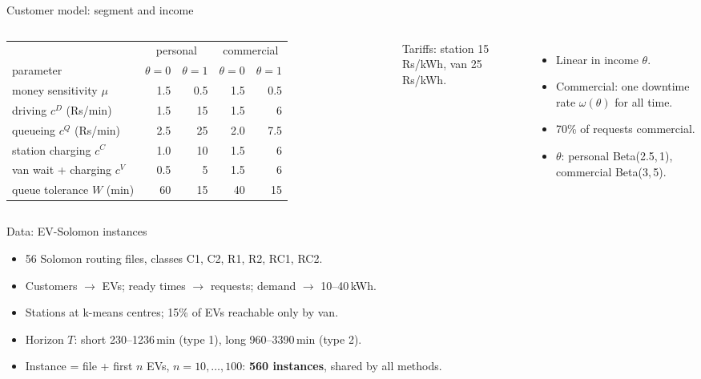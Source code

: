 \documentclass[aspectratio=169,11pt,t]{beamer}
\begin{document}
\begin{frame}{Customer model: segment and income}
\begin{columns}[T]
\scriptsize\setlength{\tabcolsep}{3.5pt}
\begin{tabular}{lrrrr}
\toprule
 & \multicolumn{2}{c}{personal} & \multicolumn{2}{c}{commercial}\\
parameter & $\theta=0$ & $\theta=1$ & $\theta=0$ & $\theta=1$\\
\midrule
money sensitivity $\mu$ & 1.5 & 0.5 & 1.5 & 0.5\\
driving $c^D$ (Rs/min) & 1.5 & 15 & 1.5 & 6\\
queueing $c^Q$ (Rs/min) & 2.5 & 25 & 2.0 & 7.5\\
station charging $c^C$ & 1.0 & 10 & 1.5 & 6\\
van wait + charging $c^V$ & 0.5 & 5 & 1.5 & 6\\
queue tolerance $W$ (min) & 60 & 15 & 40 & 15\\
\bottomrule
\end{tabular}

\vspace{1ex}
Tariffs: station 15\,Rs/kWh, van 25\,Rs/kWh.
\small
\begin{itemize}
  \item Linear in income $\theta$.
  \item Commercial: one downtime rate $\omega(\theta)$ for all time.
  \item 70\% of requests commercial.
  \item $\theta$: personal Beta(2.5,\,1), commercial Beta(3,\,5).
\end{itemize}
\end{columns}
\end{frame}

\begin{frame}{Data: EV-Solomon instances}
\begin{itemize}
  \item 56 Solomon routing files, classes C1, C2, R1, R2, RC1, RC2.
  \item Customers $\to$ EVs; ready times $\to$ requests; demand $\to$ 10--40\,kWh.
  \item Stations at k-means centres; 15\% of EVs reachable only by van.
  \item Horizon $T$: short 230--1236\,min (type 1), long 960--3390\,min (type 2).
  \item Instance = file + first $n$ EVs, $n=10,\dots,100$: \textbf{560 instances}, shared by all methods.
\end{itemize}
\end{frame}
\end{document}
